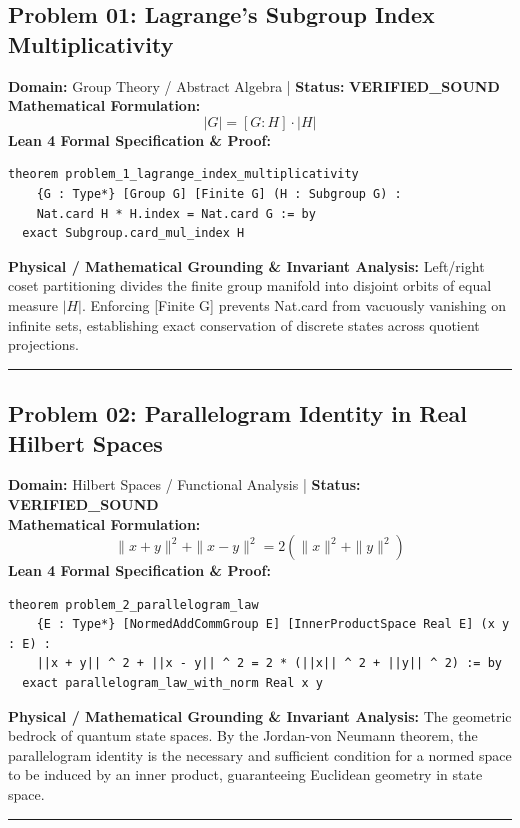 \documentclass[10pt,a4paper]{article}
\begin{document}
\subsection*{Problem 01: Lagrange's Subgroup Index Multiplicativity}
\textbf{Domain:} Group Theory / Abstract Algebra \quad | \quad \textbf{Status:} \textcolor{green!70!black}{\textbf{VERIFIED\_SOUND}}\\
\textbf{Mathematical Formulation:}
\begin{equation*}
  |G| = [G : H] \cdot |H|
\end{equation*}
\textbf{Lean 4 Formal Specification \& Proof:}
\begin{lstlisting}
theorem problem_1_lagrange_index_multiplicativity
    {G : Type*} [Group G] [Finite G] (H : Subgroup G) :
    Nat.card H * H.index = Nat.card G := by
  exact Subgroup.card_mul_index H
\end{lstlisting}
\textbf{Physical / Mathematical Grounding \& Invariant Analysis:}
Left/right coset partitioning divides the finite group manifold into disjoint orbits of equal measure $|H|$. Enforcing [Finite G] prevents Nat.card from vacuously vanishing on infinite sets, establishing exact conservation of discrete states across quotient projections.
\vspace{0.8em}\hrule\vspace{0.8em}
\subsection*{Problem 02: Parallelogram Identity in Real Hilbert Spaces}
\textbf{Domain:} Hilbert Spaces / Functional Analysis \quad | \quad \textbf{Status:} \textcolor{green!70!black}{\textbf{VERIFIED\_SOUND}}\\
\textbf{Mathematical Formulation:}
\begin{equation*}
  \|x + y\|^2 + \|x - y\|^2 = 2(\|x\|^2 + \|y\|^2)
\end{equation*}
\textbf{Lean 4 Formal Specification \& Proof:}
\begin{lstlisting}
theorem problem_2_parallelogram_law
    {E : Type*} [NormedAddCommGroup E] [InnerProductSpace Real E] (x y : E) :
    ||x + y|| ^ 2 + ||x - y|| ^ 2 = 2 * (||x|| ^ 2 + ||y|| ^ 2) := by
  exact parallelogram_law_with_norm Real x y
\end{lstlisting}
\textbf{Physical / Mathematical Grounding \& Invariant Analysis:}
The geometric bedrock of quantum state spaces. By the Jordan-von Neumann theorem, the parallelogram identity is the necessary and sufficient condition for a normed space to be induced by an inner product, guaranteeing Euclidean geometry in state space.
\vspace{0.8em}\hrule\vspace{0.8em}
\end{document}
